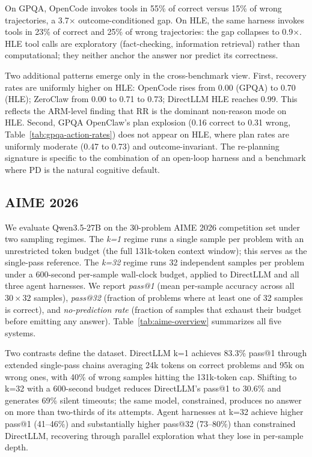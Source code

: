 On GPQA, OpenCode invokes tools in 55\% of correct versus 15\% of wrong
trajectories, a 3.7$\times$ outcome-conditioned gap.
On HLE, the same harness invokes tools in 23\% of correct and 25\% of wrong
trajectories: the gap collapses to 0.9$\times$.
HLE tool calls are exploratory (fact-checking, information retrieval) rather
than computational; they neither anchor the answer nor predict its correctness.

Two additional patterns emerge only in the cross-benchmark view.
First, recovery rates are uniformly higher on HLE: OpenCode rises from 0.00
(GPQA) to 0.70 (HLE); ZeroClaw from 0.00 to 0.71 to 0.73; DirectLLM HLE
reaches 0.99.
This reflects the ARM-level finding that RR is the dominant non-reason mode
on HLE.
Second, GPQA OpenClaw's plan explosion (0.16 correct to 0.31 wrong,
Table~\ref{tab:gpqa-action-rates}) does not appear on HLE, where plan rates
are uniformly moderate (0.47 to 0.73) and outcome-invariant.
The re-planning signature is specific to the combination of an open-loop
harness and a benchmark where PD is the natural cognitive default.


\subsection{AIME 2026}
\label{appendix:macro-aime}

We evaluate Qwen3.5-27B on the 30-problem AIME 2026 competition set under two
sampling regimes.
The \emph{k=1} regime runs a single sample per problem with an unrestricted
token budget (the full 131k-token context window); this serves as the
single-pass reference.
The \emph{k=32} regime runs 32 independent samples per problem under a
600-second per-sample wall-clock budget, applied to DirectLLM and all three
agent harnesses.
We report \emph{pass@1} (mean per-sample accuracy across all $30{\times}32$
samples), \emph{pass@32} (fraction of problems where at least one of 32
samples is correct), and \emph{no-prediction rate} (fraction of samples
that exhaust their budget before emitting any answer).
Table~\ref{tab:aime-overview} summarizes all five systems.

Two contrasts define the dataset.
DirectLLM k=1 achieves 83.3\% pass@1 through extended single-pass chains
averaging 24k tokens on correct problems and 95k on wrong ones, with 40\% of
wrong samples hitting the 131k-token cap.
Shifting to k=32 with a 600-second budget reduces DirectLLM's pass@1 to
30.6\% and generates 69\% silent timeouts; the same model, constrained,
produces no answer on more than two-thirds of its attempts.
Agent harnesses at k=32 achieve higher pass@1 (41--46\%) and substantially
higher pass@32 (73--80\%) than constrained DirectLLM, recovering through
parallel exploration what they lose in per-sample depth.

